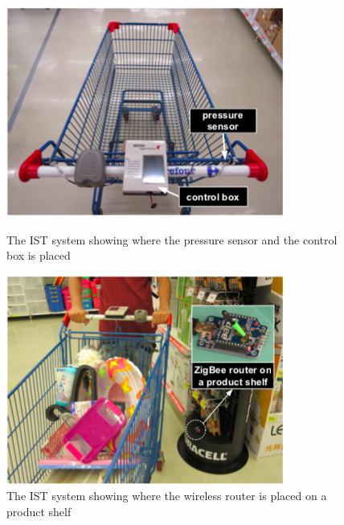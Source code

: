 \begin{figure}[H]
    \begin{minipage}[b]{0.5\linewidth}
        \centering
        \includegraphics[width=\textwidth]{figures/ISTTrolley.png}
        \caption{The IST system showing where the pressure sensor and the control box is placed\cite{wangintelligent}}
        \label{fig:trolley1}
    \end{minipage}
    \begin{minipage}[b]{0.5\linewidth}
        \centering
        \includegraphics[width=\textwidth]{figures/ISTTrolley2.png}
        \caption{The IST system showing where the wireless router is placed on a product shelf\cite{wangintelligent}}
        \label{fig:trolley2}
    \end{minipage}
\end{figure}

